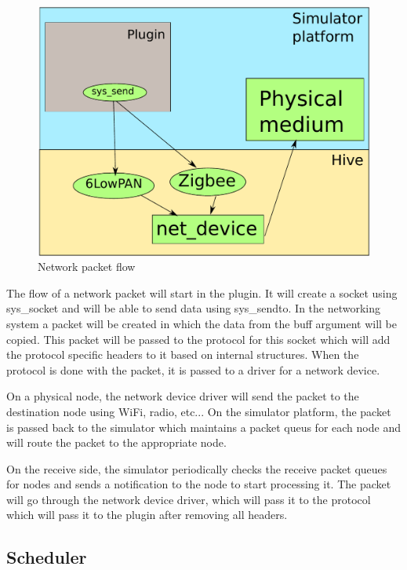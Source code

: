 \begin{figure}[htb]
  \begin{center}
    \includegraphics[scale=0.75]{img/networking.pdf}
    \caption{Network packet flow}
  \end{center}
\end{figure}

The flow of a network packet will start in the plugin. It will create a socket
using sys\_socket and will be able to send data using sys_sendto. In the
networking system a packet will be created in which the data from the buff
argument will be copied. This packet will be passed to the protocol for this
socket which will add the protocol specific headers to it based on internal
structures. When the protocol is done with the packet, it is passed to a
driver for a network device.

On a physical node, the network device driver will send the packet to the
destination node using WiFi, radio, etc... On the simulator platform, the
packet is passed back to the simulator which maintains a packet queus for each
node and will route the packet to the appropriate node.

On the receive side, the simulator periodically checks the receive packet
queues for nodes and sends a notification to the node to start processing it.
The packet will go through the network device driver, which will pass it to
the protocol which will pass it to the plugin after removing all headers.

\subsection{Scheduler}

